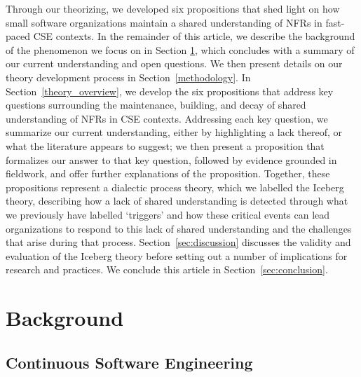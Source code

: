 \documentclass[smallextended]{svjour3}       %
\begin{document}
Through our theorizing, we developed six propositions that shed light on how small software organizations maintain a shared understanding of NFRs in fast-paced CSE contexts. In the remainder of this article, we describe the background of the phenomenon we focus on in Section \ref{background}, which concludes with a summary of our current understanding and open questions. We then present details on our theory development process in Section~\ref{methodology}.
In Section~\ref{theory_overview}, we develop the six propositions that address key questions surrounding the maintenance, building, and decay of shared understanding of NFRs in CSE contexts. Addressing each key question, we summarize our current understanding, either by highlighting a lack thereof, or what the  literature appears to suggest; we then present a proposition that formalizes our answer to that key question, followed by evidence grounded in fieldwork, and offer further explanations of the proposition. 
Together, these propositions represent a dialectic process theory, which we labelled the Iceberg theory, describing how a lack of shared understanding is detected through what we previously have labelled `triggers' \citep{werner2020re} and how these critical events can lead organizations to respond to this lack of shared understanding and the challenges that arise during that process.
Section~\ref{sec:discussion} discusses the validity and evaluation of the Iceberg theory before setting out a number of implications for research and practices. We conclude this article in Section~\ref{sec:conclusion}.


\section{Background}
\label{background}


\subsection{Continuous Software Engineering}
\end{document}
